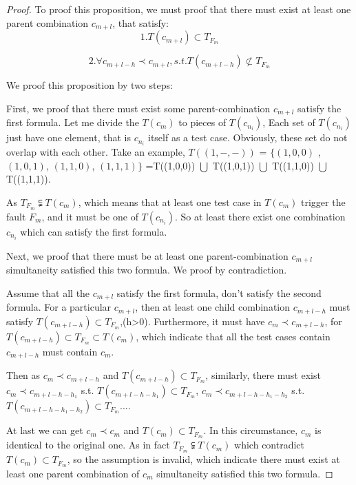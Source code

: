 \documentclass{sig-alternate}
\begin{document}
\begin{proof}

To proof this proposition, we must proof that there must exist at least one parent combination $c_{m+l}$, that satisfy:
\begin{displaymath}
1. T(c_{m+l}) \subset T_{F_{m}}
\end{displaymath}

\begin{displaymath}
2.\forall c_{m+l-h} \prec c_{m+l}, s.t. T(c_{m+l-h}) \not\subset T_{F_{m}} \end{displaymath}

We proof this proposition by two steps:

First, we proof that there must exist some parent-combination $c_{m+l}$ satisfy the first formula. Let me divide the $T(c_{m})$ to pieces of $T(c_{n_{i}})$, Each set of $T(c_{n_{i}})$ just have one element, that is $c_{n_{i}}$ itself as a test case. Obviously, these set do not overlap with each other. Take an example, $T((1,-,-))$ = $\{(1,0,0)$ ,$(1,0,1)$, $(1,1,0)$, $(1,1,1)\}$ =T((1,0,0)) $\bigcup$ T((1,0,1)) $\bigcup$ T((1,1,0)) $\bigcup$ T((1,1,1)).

As $T_{F_{m}} \subsetneqq T(c_{m})$, which means that at least one test case in $T(c_{m})$ trigger the fault $F_{m}$, and it must be one of $T(c_{n_{i}})$. So at least there exist one combination $c_{n_{i}}$ which can satisfy the first formula.

Next, we proof that there must be at least one parent-combination $c_{m+l}$ simultaneity satisfied this two formula. We proof by contradiction.

Assume that all the $c_{m+l}$ satisfy the first formula, don't satisfy the second formula.
For a particular $c_{m+l}$, then at least one child combination $c_{m+l-h}$ must satisfy $T(c_{m+l-h}) \subset T_{F_{m}}$,(h>0). Furthermore, it must have $c_{m} \prec c_{m+l-h}$, for $T(c_{m+l-h}) \subset T_{F_{m}} \subset T(c_{m})$, which indicate that all the test cases contain $c_{m+l-h}$ must contain $c_{m}$.

Then as $c_{m} \prec c_{m+l-h} $ and $T(c_{m+l-h}) \subset T_{F_{m}}$, similarly, there must exist $c_{m} \prec c_{m+l-h-h_{1}}$ s.t. $T(c_{m+l-h-h_{1}}) \subset T_{F_{m}}$, $c_{m} \prec c_{m+l-h-h_{1}-h_{2}}$ s.t. $T(c_{m+l-h-h_{1}-h_{2}}) \subset T_{F_{m}}$....

At last we can get  $c_{m} \prec c_{m} $ and $T(c_{m}) \subset T_{F_{m}}$. In this circumstance, $c_{m}$ is identical to the original one. As in fact $T_{F_{m}} \subsetneqq T(c_{m})$ which contradict $T(c_{m}) \subset T_{F_{m}}$, so the assumption is invalid, which indicate there must exist at least one parent combination of $c_{m}$ simultaneity satisfied this two formula.


\end{proof}
\end{document}
